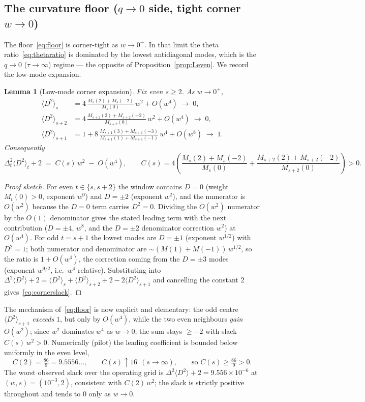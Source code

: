 \documentclass[11pt]{article}
\newtheorem{lemma}{Lemma}
\theoremstyle{definition}
\newcommand{\Dsq}{\langle D^2\rangle}
\begin{document}
\subsection{The curvature floor ($q\to0$ side, tight corner $w\to0$)}

The floor~\eqref{eq:floor} is corner-tight as $w\to0^+$. In that limit the
theta ratio~\eqref{eq:thetaratio} is dominated by the lowest antidiagonal modes,
which is the $q\to0$ ($\tau\to\infty$) regime --- the opposite of
Proposition~\ref{prop:Leven}. We record the low-mode expansion.

\begin{lemma}[Low-mode corner expansion]\label{lem:lowmode}
Fix even $s\ge2$. As $w\to0^+$,
\begin{align}
  \Dsq_{s}   &= 4\,\frac{M_{s}(2)+M_{s}(-2)}{M_{s}(0)}\,w^2 + O(w^4)\;\to\;0,\\
  \Dsq_{s+2} &= 4\,\frac{M_{s+2}(2)+M_{s+2}(-2)}{M_{s+2}(0)}\,w^2 + O(w^4)\;\to\;0,\\
  \Dsq_{s+1} &= 1 + 8\,\frac{M_{s+1}(3)+M_{s+1}(-3)}{M_{s+1}(1)+M_{s+1}(-1)}\,w^4 + O(w^8)\;\to\;1.
\end{align}
Consequently
\begin{equation}\label{eq:cornerslack}
  \Delta^2_t\Dsq_t + 2 \;=\; C(s)\,w^2 \;-\; O(w^4),
  \qquad
  C(s)= 4\!\left(\frac{M_{s}(2)+M_{s}(-2)}{M_{s}(0)}
        +\frac{M_{s+2}(2)+M_{s+2}(-2)}{M_{s+2}(0)}\right)>0 .
\end{equation}
\end{lemma}

\begin{proof}[Proof sketch]
For even $t\in\{s,s+2\}$ the window contains $D=0$ (weight $M_t(0)>0$, exponent
$w^0$) and $D=\pm2$ (exponent $w^{2}$), and the numerator is $O(w^2)$ because the
$D=0$ term carries $D^2=0$. Dividing the $O(w^2)$ numerator by the $O(1)$
denominator gives the stated leading term with the next contribution ($D=\pm4$,
$w^{8}$, and the $D=\pm2$ denominator correction $w^2$) at $O(w^4)$. For odd
$t=s+1$ the lowest modes are $D=\pm1$ (exponent $w^{1/2}$) with $D^2=1$; both
numerator and denominator are $\sim(M(1)+M(-1))\,w^{1/2}$, so the ratio is
$1+O(w^4)$, the correction coming from the $D=\pm3$ modes (exponent $w^{9/2}$,
i.e.\ $w^4$ relative). Substituting into
$\Delta^2\Dsq+2=\Dsq_s+\Dsq_{s+2}+2-2\Dsq_{s+1}$ and cancelling the constant
$2$ gives~\eqref{eq:cornerslack}.
\end{proof}

The mechanism of~\eqref{eq:floor} is now explicit and elementary: the odd centre
$\Dsq_{s+1}$ \emph{exceeds} $1$, but only by $O(w^4)$, while the two even
neighbours \emph{gain} $O(w^2)$; since $w^2$ dominates $w^4$ as $w\to0$, the sum
stays $\ge-2$ with slack $C(s)\,w^2>0$. Numerically (pilot) the leading
coefficient is bounded below uniformly in the even level,
\[
  C(2)=\tfrac{86}{9}=9.5556\ldots,\qquad C(s)\uparrow 16\ \ (s\to\infty),
  \qquad\text{so } C(s)\ge \tfrac{86}{9}>0 .
\]
The worst observed slack over the operating grid is
$\Delta^2\Dsq+2 = 9.556\times10^{-6}$ at $(w,s)=(10^{-3},2)$, consistent with
$C(2)\,w^2$; the slack is strictly positive throughout and tends to $0$ only as
$w\to0$.
\end{document}
